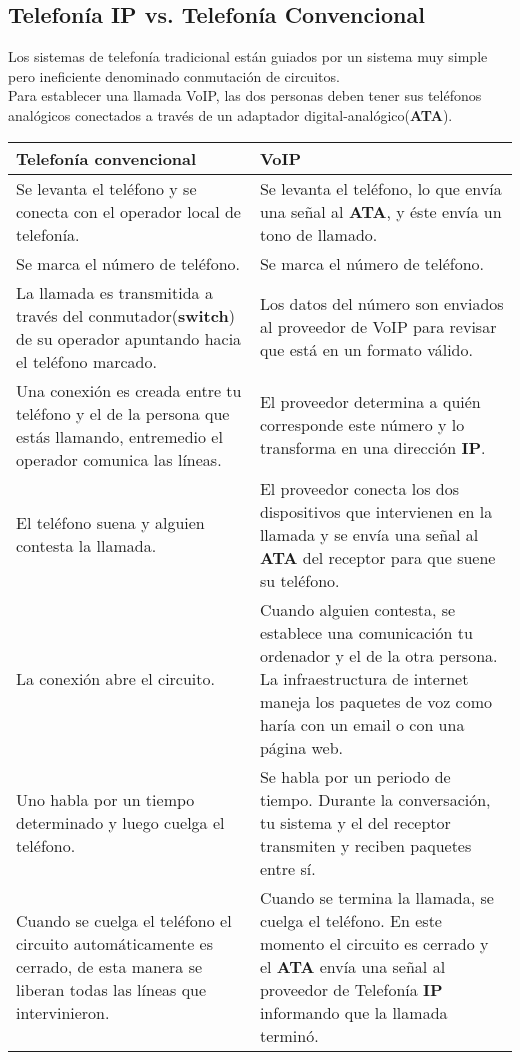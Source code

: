 \documentclass[a4paper, 11pt]{article} %
\begin{document}
	\subsection{Telefonía IP vs. Telefonía Convencional}
		Los sistemas de telefonía tradicional están guiados por un sistema muy simple pero ineficiente denominado conmutación de circuitos.\\
		Para establecer una llamada VoIP, las dos personas deben tener sus teléfonos analógicos conectados a través de un adaptador digital-analógico(\textbf{ATA}).\\
		\begin{tabular}{|p{6cm}|p{6cm}|}
		\hline
		Telefonía convencional & VoIP \\
		\hline \hline
		Se levanta el teléfono y se conecta con el operador local de telefonía. & Se levanta el teléfono, lo que envía una señal al \textbf{ATA}, y éste envía un tono de llamado. \\
		\hline
		Se marca el número de teléfono. & Se marca el número de teléfono. \\
		\hline
		La llamada es transmitida a través del conmutador(\textbf{switch}) de su operador apuntando hacia el teléfono marcado. & Los datos del número son enviados al proveedor de VoIP para revisar que está en un formato válido. \\
		\hline
		Una conexión es creada entre tu teléfono y el de la persona que estás llamando, entremedio el operador comunica las líneas. & El proveedor determina a quién corresponde este número y lo transforma en una dirección \textbf{IP}. \\
		\hline
		El teléfono suena y alguien contesta la llamada. & El proveedor conecta los dos dispositivos que intervienen en la llamada y se envía una señal al \textbf{ATA} del receptor para que suene su teléfono. \\
		\hline
		La conexión abre el circuito. & Cuando alguien contesta, se establece una comunicación tu ordenador y el de la otra persona. La infraestructura de internet maneja los paquetes de voz como haría con un email o con una página web. \\
		\hline
		Uno habla por un tiempo determinado y luego cuelga el teléfono. & Se habla por un periodo de tiempo. Durante la conversación, tu sistema y el del receptor transmiten y reciben paquetes entre sí. \\
		\hline
		Cuando se cuelga el teléfono el circuito automáticamente es cerrado, de esta manera se liberan todas las líneas que intervinieron. & Cuando se termina la llamada, se cuelga el teléfono. En este momento el circuito es cerrado y el \textbf{ATA} envía una señal al proveedor de Telefonía \textbf{IP} informando que la llamada terminó. \\
		\hline
		\end{tabular}
		\label{tabla:vs}
	
\end{document}
